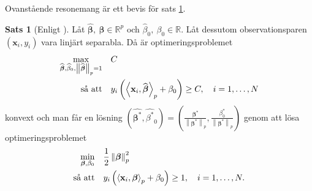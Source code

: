 \documentclass[a4paper, 12pt]{report}
\theoremstyle{definition}
\newtheorem{thm}{Sats}[section]
\newtheorem{cor}[thm]{Korollarium}
\theoremstyle{remark}
\newcommand{\bfbeta}{{\boldsymbol{\beta}}}
\newcommand{\bfx}{\mathbf{x}}
\newcommand{\llangle}{\left\langle}
\newcommand{\rrangle}{\right\rangle}
\newcommand{\inner}[2]{\llangle #1, #2 \rrangle}
\begin{document}
Ovanstående resonemang är ett bevis för sats \ref{thm:primallinearproblem}.
\begin{thm}[Enligt \cite{ESL}]\label{thm:primallinearproblem}
	Låt $\widehat{\bfbeta},~\bfbeta \in \mathbb{R}^p$ och $\widehat{\beta}_0,~\beta_0 \in \mathbb{R}$. Låt dessutom observationsparen $\left(\mathbf{x}_i, y_i\right)$ vara linjärt separabla. Då är optimeringsproblemet
	\begin{equation*}
	\begin{aligned}
	\operatornamewithlimits{max}_{\widehat{\bfbeta},\widehat{\beta}_0,\left\|\widehat{\bfbeta}
\right\|_p=1} & & &C\\
	\text{så att} & & &y_i\left(\inner{\bfx_i}{\widehat{\bfbeta}}_p+\beta_0\right)\geq C,\quad i=1,\dots,N
	\end{aligned}
	\end{equation*}
	konvext och man får en lösning $\left(\widehat{\bfbeta^*},\widehat{\beta^*}_0\right)=\left(\frac{\bfbeta^*}{\left\|\bfbeta^*\right\|_p}, \frac{\beta^*_0}{\left\|\bfbeta^*\right\|_p}\right)$ genom att lösa optimeringsproblemet
	\begin{equation*}
	\begin{aligned}
	\operatornamewithlimits{min}_{\bfbeta,\beta_0} & & &\frac{1}{2}\left\|\bfbeta
\right\|_p^2\\
	\text{så att} & & &y_i\left(\inner{\bfx_i}{\bfbeta}_p+\beta_0\right)\geq 1,\quad i=1,\dots,N.
	\end{aligned}
	\end{equation*}
\end{thm}
\end{document}
